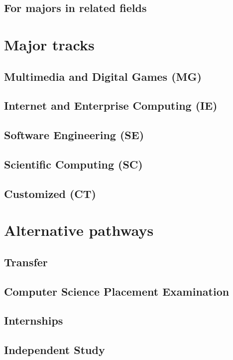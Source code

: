 \documentclass{book}
\begin{document}
\section{For majors in related fields}

\chapter{Major tracks}

\section{Multimedia and Digital Games (MG)}
\section{Internet and Enterprise Computing (IE)}
\section{Software Engineering (SE)}
\section{Scientific Computing (SC)}
\section{Customized (CT)}

\chapter{Alternative pathways}

\section{Transfer}

\section{Computer Science Placement Examination}

\section{Internships}

\section{Independent Study}
\end{document}

